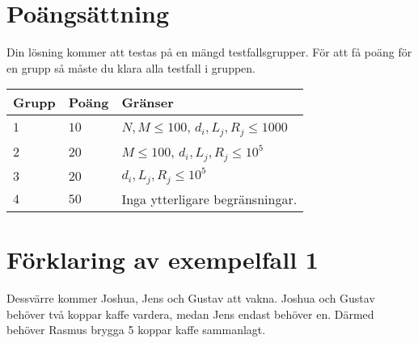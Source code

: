 \section*{Poängsättning}
Din lösning kommer att testas på en mängd testfallsgrupper.
För att få poäng för en grupp så måste du klara alla testfall i gruppen.

\noindent
\begin{tabular}{| l | l | p{12cm} |}
  \hline
  \textbf{Grupp} & \textbf{Poäng} & \textbf{Gränser} \\ \hline
  $1$    & $10$       & $N, M \le 100$, $d_i, L_j, R_j \le 1000$ \\ \hline
  $2$    & $20$       & $M \le 100$, $d_i, L_j, R_j \le 10^5$ \\ \hline
  $3$    & $20$       & $d_i, L_j, R_j \le 10^5$ \\ \hline
  $4$    & $50$       & Inga ytterligare begränsningar. \\ \hline
\end{tabular}

\section*{Förklaring av exempelfall 1}
Dessvärre kommer Joshua, Jens och Gustav att vakna. Joshua och Gustav behöver två koppar kaffe vardera, medan Jens endast behöver en.
Därmed behöver Rasmus brygga 5 koppar kaffe sammanlagt.
